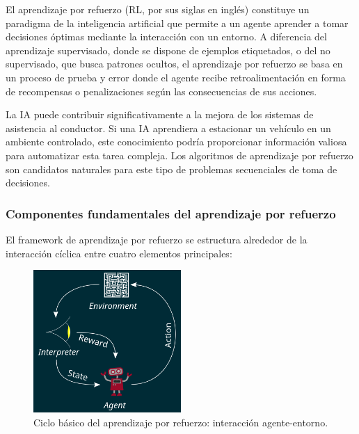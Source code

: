\noindent
El aprendizaje por refuerzo (RL, por sus siglas en inglés) constituye un paradigma de la inteligencia artificial
que permite a un agente aprender a tomar decisiones óptimas mediante la interacción con un entorno.
A diferencia del aprendizaje supervisado, donde se dispone de ejemplos etiquetados, o del no supervisado,
que busca patrones ocultos, el aprendizaje por refuerzo se basa en un proceso de prueba y error donde el agente
recibe retroalimentación en forma de recompensas o penalizaciones según las consecuencias de sus acciones.

\noindent
La IA puede contribuir significativamente a la mejora de los sistemas de asistencia al conductor.
Si una IA aprendiera a estacionar un vehículo en un ambiente controlado, este conocimiento podría
proporcionar información valiosa para automatizar esta tarea compleja. Los algoritmos de aprendizaje
por refuerzo son candidatos naturales para este tipo de problemas secuenciales de toma de decisiones.

\subsubsection{Componentes fundamentales del aprendizaje por refuerzo}\label{subsec:rl-components}
\noindent
El framework de aprendizaje por refuerzo se estructura alrededor de la interacción cíclica entre
cuatro elementos principales:

\begin{figure}[!ht]
    \centering
    \includegraphics[width=0.5\textwidth]{img/2-mt/RL.png}
    \caption{Ciclo básico del aprendizaje por refuerzo: interacción agente-entorno.}
    \label{fig:rl-cycle}
\end{figure}

